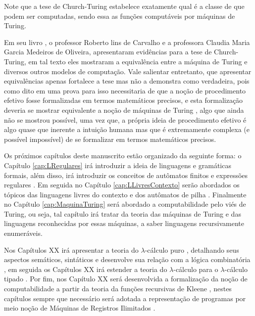 \begin{rema}
	Note que a tese de Church-Turing estabelece exatamente qual é a classe de que podem ser computadas, sendo essa as funções computáveis por máquinas de Turing.
\end{rema}

Em seu livro \cite{roberto1998}, o professor Roberto lins de Carvalho e a professora Claudia Maria Garcia Medeiros de Oliveira, apresentaram evidências para a tese de Church-Turing, em tal texto eles mostraram a equivalência entre a máquina de Turing e diversos outros modelos de computação. Vale salientar entretanto, que apresentar equivalências apenas fortalece a tese mas não a demonstra como verdadeira, pois como dito em \cite{benjaLivro2010, roberto1998, sernadas2006} uma prova para isso necessitaria de que a noção de procedimento efetivo fosse formalizadas em termos matemáticos precisos, e esta formalização deveria se mostrar equivalente a noção de máquinas de Turing \cite{benjaLivro2010}, algo que ainda não se mostrou possível, uma vez que, a própria ideia de procedimento efetivo é algo quase que inerente a intuição humana mas que é extremamente complexa (e possível impossível) de se formalizar em termos matemáticos precisos.

Os próximos capítulos deste manuscrito estão organizado da seguinte forma: o Capítulo \ref{cap:LRegulares} irá introduzir a ideia de linguagens e gramáticas formais, além disso, irá introduzir os conceitos de autômatos finitos e expressões regulares \cite{benjaLivro2010, hopcroft2008, linz2006}. Em seguida no Capítulo \ref{cap:LLivresContexto} serão abordados os tópicos das linguagens livres do contexto e dos autômatos de pilha \cite{benjaLivro2010, menezes1998LFA}. Finalmente no Capítulo \ref{cap:MaquinaTuring} será abordado a computabilidade pelo viés de Turing, ou seja, tal capítulo irá tratar da teoria das máquinas de Turing \cite{benjaLivro2010, menezes1998LFA, turing1937} e das linguagens reconhecidas por essas máquinas, a saber linguagens recursivamente enumeráveis. 

Nos Capítulos XX irá apresentar a teoria do $\lambda$-cálculo puro \cite{bare1984, henk1992, hankin2004}, detalhando seus aspectos semáticos, sintáticos e desenvolve sua relação com a lógica combinatória \cite{bimbo2019, hankin2004}, em seguida os Capítulos XX irá estender a teoria do $\lambda$-cálculo para o $\lambda$-cálculo tipado \cite{henk1992, hankin2004}. Por fim, nos Capítulo XX será desenvolvida a formalização da noção de computabilidade a partir da teoria da funções recursivas de Kleene \cite{kleene1936}, nestes capítulos sempre que necessário será adotada a representação de programas por meio noção de Máquinas de Registros Ilimitados \cite{cutland1980, menezes2003}. 

